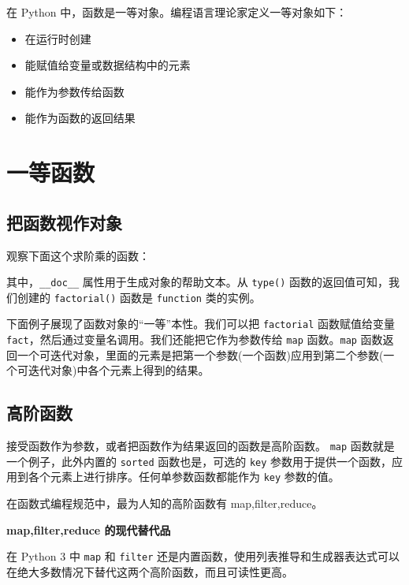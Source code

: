 在 Python 中，函数是一等对象。编程语言理论家定义一等对象如下：
\begin{itemize}
    \item 在运行时创建
    \item 能赋值给变量或数据结构中的元素
    \item 能作为参数传给函数
    \item 能作为函数的返回结果
\end{itemize}

\section{一等函数}
\subsection{把函数视作对象}

观察下面这个求阶乘的函数：



其中，\texttt{\_\_doc\_\_} 属性用于生成对象的帮助文本。从 \texttt{type()} 函数的返回值可知，我们创建的 \texttt{factorial()} 函数是 \texttt{function} 类的实例。

下面例子展现了函数对象的``一等''本性。我们可以把 \texttt{factorial} 函数赋值给变量 \texttt{fact}，然后通过变量名调用。我们还能把它作为参数传给 \texttt{map} 函数。\texttt{map} 函数返回一个可迭代对象，里面的元素是把第一个参数(一个函数)应用到第二个参数(一个可迭代对象)中各个元素上得到的结果。



\subsection{高阶函数}

接受函数作为参数，或者把函数作为结果返回的函数是高阶函数。 \texttt{map} 函数就是一个例子，此外内置的 \texttt{sorted} 函数也是，可选的 \texttt{key} 参数用于提供一个函数，应用到各个元素上进行排序。任何单参数函数都能作为 \texttt{key} 参数的值。



在函数式编程规范中，最为人知的高阶函数有 map,filter,reduce。

\noindent\textbf{map,filter,reduce 的现代替代品}

在 Python 3 中 \texttt{map} 和 \texttt{filter} 还是内置函数，使用列表推导和生成器表达式可以在绝大多数情况下替代这两个高阶函数，而且可读性更高。

